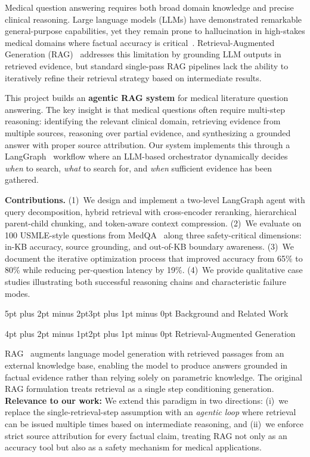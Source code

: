 \documentclass[10pt,twocolumn,letterpaper]{article}
\makeatletter
\renewcommand\section{\@startsection{section}{1}{\z@}%
  {5pt plus 2pt minus 2pt}{3pt plus 1pt minus 0pt}%
  {\large\bfseries}}
\renewcommand\subsection{\@startsection{subsection}{2}{\z@}%
  {4pt plus 2pt minus 1pt}{2pt plus 1pt minus 0pt}%
  {\normalsize\bfseries}}
\makeatother
\begin{document}
Medical question answering requires both broad domain knowledge and precise clinical reasoning. Large language models (LLMs) have demonstrated remarkable general-purpose capabilities, yet they remain prone to hallucination in high-stakes medical domains where factual accuracy is critical~\cite{ji2023survey}. Retrieval-Augmented Generation (RAG)~\cite{lewis2020retrieval} addresses this limitation by grounding LLM outputs in retrieved evidence, but standard single-pass RAG pipelines lack the ability to iteratively refine their retrieval strategy based on intermediate results.

This project builds an \textbf{agentic RAG system} for medical literature question answering. The key insight is that medical questions often require multi-step reasoning: identifying the relevant clinical domain, retrieving evidence from multiple sources, reasoning over partial evidence, and synthesizing a grounded answer with proper source attribution. Our system implements this through a LangGraph~\cite{langgraph} workflow where an LLM-based orchestrator dynamically decides \emph{when} to search, \emph{what} to search for, and \emph{when} sufficient evidence has been gathered.

\textbf{Contributions.}
(1)~We design and implement a two-level LangGraph agent with query decomposition, hybrid retrieval with cross-encoder reranking, hierarchical parent-child chunking, and token-aware context compression.
(2)~We evaluate on 100 USMLE-style questions from MedQA~\cite{jin2021disease} along three safety-critical dimensions: in-KB accuracy, source grounding, and out-of-KB boundary awareness.
(3)~We document the iterative optimization process that improved accuracy from 65\% to 80\% while reducing per-question latency by 19\%.
(4)~We provide qualitative case studies illustrating both successful reasoning chains and characteristic failure modes.

\section{Background and Related Work}

\subsection{Retrieval-Augmented Generation}

RAG~\cite{lewis2020retrieval} augments language model generation with retrieved passages from an external knowledge base, enabling the model to produce answers grounded in factual evidence rather than relying solely on parametric knowledge. The original RAG formulation treats retrieval as a single step conditioning generation. \textbf{Relevance to our work:} We extend this paradigm in two directions: (i)~we replace the single-retrieval-step assumption with an \emph{agentic loop} where retrieval can be issued multiple times based on intermediate reasoning, and (ii)~we enforce strict source attribution for every factual claim, treating RAG not only as an accuracy tool but also as a safety mechanism for medical applications.
\end{document}
